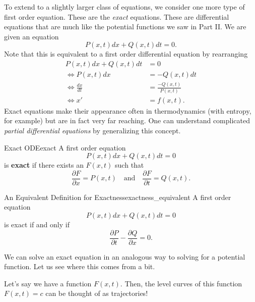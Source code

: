         To extend to a slightly larger class of equations, we consider one more type of first order equation.  These are the \emph{exact} equations.  These are differential equations that are much like the potential functions we saw in Part II.  We are given an equation
        \[
        P(x,t)dx + Q(x,t)dt = 0.
        \]
        Note that this is equivalent to a first order differential equation by rearranging
        \begin{align*}
            P(x,t)dx+Q(x,t)dt &= 0 \\
            \iff P(x,t)dx &= - Q(x,t)dt\\
            \iff \frac{dx}{dt} &= \frac{-Q(x,t)}{P(x,t)}\\
            \iff x' &= f(x,t).
        \end{align*}
        Exact equations make their appearance often in thermodynamics (with entropy, for example) but are in fact very far reaching.  One can understand complicated \emph{partial differential equations} by generalizing this concept.
        
        \begin{df}{Exact ODE}{exact}
        A first order equation 
        \[
        P(x,t)dx + Q(x,t)dt = 0
        \]
        is \textbf{exact} if there exists an $F(x,t)$ such that
        \[
        \frac{\partial F}{\partial x}= P(x,t) \quad \textrm{and} \quad \frac{\partial F}{\partial t}= Q(x,t).
        \]
        \end{df}
        
        \begin{prop}{An Equivalent Definition for Exactness}{exactness_equivalent}
        A first order equation
        \[
        P(x,t)dx + Q(x,t)dt = 0
        \]
        is exact if and only if
        \[
        \frac{\partial P}{\partial t}-\frac{\partial Q}{\partial x}=0.
        \]
        \end{prop}
                
        We can solve an exact equation in an analogous way to solving for a potential function.  Let us see where this comes from a bit.
        
        Let's say we have a function $F(x,t)$.  Then, the level curves of this function $F(x,t)=c$ can be thought of as trajectories!  
        

